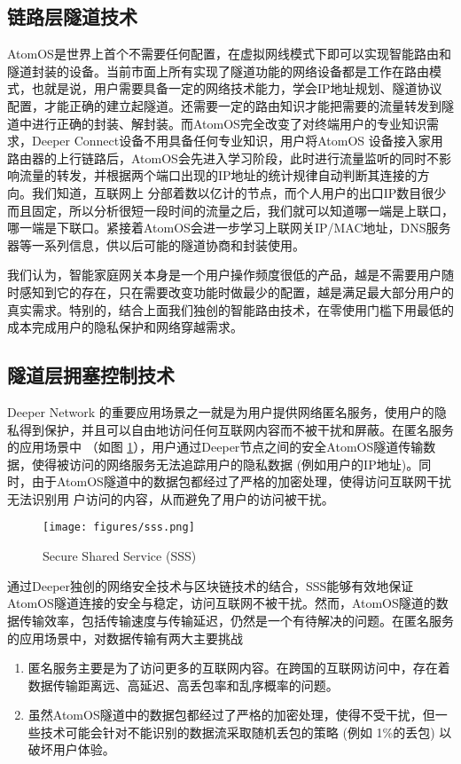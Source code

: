 \documentclass[a4paper]{article}
\begin{document}
\subsection{链路层隧道技术}
AtomOS是世界上首个不需要任何配置，在虚拟网线模式下即可以实现智能路由和隧道封装的设备。当前市面上所有实现了隧道功能的网络设备都是工作在路由模式，也就是说，用户需要具备一定的网络技术能力，学会IP地址规划、隧道协议配置，才能正确的建立起隧道。还需要一定的路由知识才能把需要的流量转发到隧道中进行正确的封装、解封装。而AtomOS完全改变了对终端用户的专业知识需求，Deeper Connect设备不用具备任何专业知识，用户将AtomOS 设备接入家用路由器的上行链路后，AtomOS会先进入学习阶段，此时进行流量监听的同时不影响流量的转发，并根据两个端口出现的IP地址的统计规律自动判断其连接的方向。我们知道，互联网上
分部着数以亿计的节点，而个人用户的出口IP数目很少而且固定，所以分析很短一段时间的流量之后，我们就可以知道哪一端是上联口，哪一端是下联口。紧接着AtomOS会进一步学习上联网关IP/MAC地址，DNS服务器等一系列信息，供以后可能的隧道协商和封装使用。

我们认为，智能家庭网关本身是一个用户操作频度很低的产品，越是不需要用户随时感知到它的存在，只在需要改变功能时做最少的配置，越是满足最大部分用户的真实需求。特别的，结合上面我们独创的智能路由技术，在零使用门槛下用最低的成本完成用户的隐私保护和网络穿越需求。

\subsection{隧道层拥塞控制技术}
Deeper Network 的重要应用场景之一就是为用户提供网络匿名服务，使用户的隐私得到保护，并且可以自由地访问任何互联网内容而不被干扰和屏蔽。在匿名服务的应用场景中 （如图 \ref{fig:sss}），用户通过Deeper节点之间的安全AtomOS隧道传输数据，使得被访问的网络服务无法追踪用户的隐私数据 (例如用户的IP地址)。同时，由于AtomOS隧道中的数据包都经过了严格的加密处理，使得访问互联网干扰无法识别用
户访问的内容，从而避免了用户的访问被干扰。

\begin{figure}[hhhh]
\centering
\texttt{[image: figures/sss.png]}
\caption{Secure Shared Service (SSS)}
\label{fig:sss}
\end{figure}

通过Deeper独创的网络安全技术与区块链技术的结合，SSS能够有效地保证AtomOS隧道连接的安全与稳定，访问互联网不被干扰。然而，AtomOS隧道的数据传输效率，包括传输速度与传输延迟，仍然是一个有待解决的问题。在匿名服务的应用场景中，对数据传输有两大主要挑战
\begin{enumerate}
\item 匿名服务主要是为了访问更多的互联网内容。在跨国的互联网访问中，存在着数据传输距离远、高延迟、高丢包率和乱序概率的问题。
\item 虽然AtomOS隧道中的数据包都经过了严格的加密处理，使得不受干扰，但一些技术可能会针对不能识别的数据流采取随机丢包的策略 (例如 1\%的丢包) 以破坏用户体验。
\end{enumerate}
\end{document}
